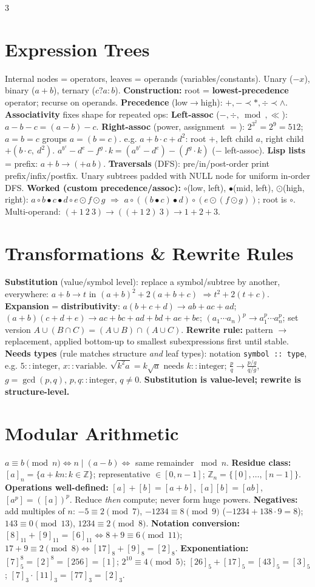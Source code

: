 \documentclass[9pt]{extarticle}
\newcommand{\hl}[1]{\textbf{\textcolor{BrickRed}{#1}}}
\begin{document}
\begin{multicols}{3}
\section{Expression Trees}
Internal nodes = operators, leaves = operands (variables/constants). Unary ($-x$), binary ($a+b$), ternary ($c?a:b$). \hl{Construction:} root = \hl{lowest-precedence} operator; recurse on operands. \hl{Precedence} (low$\to$high): $+,- \prec *,\div \prec \wedge$. \hl{Associativity} fixes shape for repeated ops:
\hl{Left-assoc} ($-,\div,\bmod,\ll$): $a-b-c=(a-b)-c$. \hl{Right-assoc} (power, assignment $=$): $2^{3^2}=2^9=512$; $a=b=c$ groups $a=(b=c)$.
e.g. $a+b\cdot c+d^2$: root $+$, left child $a$, right child $+(b\cdot c,\ d^2)$. $a^{b^c}-d^e-f^g\cdot k=(a^{b^c}-d^e)-(f^g\cdot k)$ ($-$ left-assoc).
\hl{Lisp lists} = prefix: $a+b\to(+a\,b)$. \hl{Traversals} (DFS): pre/in/post-order print prefix/infix/postfix. Unary subtrees padded with NULL node for uniform in-order DFS.
\textbf{Worked (custom precedence/assoc):} $\circ$(low, left), $\bullet$(mid, left), $\odot$(high, right): $a\circ b\bullet c\bullet d\circ e\odot f\odot g$ $\Rightarrow$ $a\circ((b\bullet c)\bullet d)\circ(e\odot(f\odot g))$; root is $\circ$. Multi-operand: $(+\ 1\ 2\ 3)\to((+\ 1\ 2)\ 3)\to1+2+3$.

\section{Transformations \& Rewrite Rules}
\hl{Substitution} (value/symbol level): replace a symbol/subtree by another, everywhere: $a+b\to t$ in $(a+b)^2+2(a+b+c)$ $\Rightarrow t^2+2(t+c)$.
\hl{Expansion} = \hl{distributivity}: $a(b+c+d)\to ab+ac+ad$; $(a+b)(c+d+e)\to ac+bc+ad+bd+ae+be$; $(a_1\cdots a_n)^p\to a_1^p\cdots a_n^p$; set version $A\cup(B\cap C)=(A\cup B)\cap(A\cup C)$.
\hl{Rewrite rule:} pattern $\to$ replacement, applied bottom-up to smallest subexpressions first until stable. \hl{Needs types} (rule matches structure \emph{and} leaf types): notation \texttt{symbol :: type}, e.g. $5::\mathrm{integer}$, $x::\mathrm{variable}$. $\sqrt{k^2a}=k\sqrt a$ needs $k::\mathrm{integer}$; $\frac pq\to\frac{p/g}{q/g}$, $g=\gcd(p,q)$, $p,q::\mathrm{integer}$, $q\ne0$. \hl{Substitution is value-level; rewrite is structure-level.}

\section{Modular Arithmetic}
$a\equiv b\pmod n \iff n\mid(a-b) \iff$ same remainder $\bmod n$. \hl{Residue class:} $[a]_n=\{a+kn:k\in\mathbb Z\}$; representative $\in[0,n-1]$; $\mathbb Z_n=\{[0],\ldots,[n-1]\}$.
\hl{Operations well-defined:} $[a]+[b]=[a+b]$, $[a][b]=[ab]$, $[a^p]=([a])^p$. Reduce \emph{then} compute; never form huge powers.
\hl{Negatives:} add multiples of $n$: $-5\equiv2\pmod7$, $-1234\equiv8\pmod9$ ($-1234+138\cdot9=8$); $143\equiv0\pmod{13}$, $1234\equiv2\pmod8$.
\hl{Notation conversion:} $[8]_{11}+[9]_{11}=[6]_{11}\iff8+9\equiv6\pmod{11}$; $17+9\equiv2\pmod8\iff[17]_8+[9]_8=[2]_8$.
\hl{Exponentiation:} $[7]_5^8=[2]^8=[256]=[1]$; $2^{10}\equiv4\pmod5$; $[26]_5+[17]_5=[43]_5=[3]_5$; $[7]_3\cdot[11]_3=[77]_3=[2]_3$.


\end{multicols}
\end{document}
